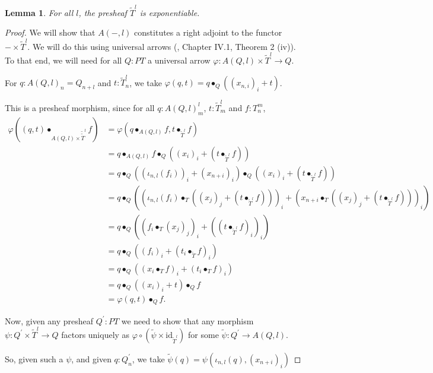 \documentclass[a4paper]{amsbook}
\newtheorem{lemma}{Lemma}
\theoremstyle{definition}
\theoremstyle{remark}
\newcommand{\id}[1]{\ensuremath{\text{id}_{#1}}}
\begin{document}
  \begin{lemma}
    For all $ l $, the presheaf $ \tilde T^l $ is exponentiable.
  \end{lemma}
  \begin{proof}
    We will show that $ A(-, l) $ constitutes a right adjoint to the functor $ - \times \tilde T^l $. We will do this using universal arrows (\cite{MacLane}, Chapter IV.1, Theorem 2 (iv)). To that end, we will need for all $ Q: PT $ a universal arrow $ \varphi: A(Q, l) \times \tilde T^l \to Q $.

    For $ q: A(Q, l)_n = Q_{n + l} $ and $ t: \tilde T^l_n $, we take $ \varphi(q, t) = q \bullet_Q ((x_{n, i})_i + t) $.

    This is a presheaf morphism, since for all $ q: A(Q, l)^l_m $, $ t: \tilde T^l_m $ and $ f: T_n^m $,
    \begin{align*}
      \varphi((q, t) \bullet_{A(Q, l) \times \tilde \tilde T^l} f) &= \varphi(q \bullet_{A(Q, l)} f, t \bullet_{\tilde T^l} f)\\
      &= q \bullet_{A(Q, l)} f \bullet_Q ((x_i)_i + (t \bullet_{\tilde T^l} f))\\
      &= q \bullet_Q ((\iota_{n, l}(f_i))_i + (x_{n + i})_i) \bullet_Q ((x_i)_i + (t \bullet_{\tilde T^l} f))\\
      &= q \bullet_Q ((\iota_{n, l}(f_i) \bullet_T ((x_j)_j + (t \bullet_{\tilde T^l} f)))_i + (x_{n + i} \bullet_T ((x_j)_j + (t \bullet_{\tilde T^l} f)))_i)\\
      &= q \bullet_Q ((f_i \bullet_T (x_j)_j)_i + ((t \bullet_{\tilde T^l} f)_i)_i)\\
      &= q \bullet_Q ((f_i)_i + (t_i \bullet_{\tilde T} f)_i)\\
      &= q \bullet_Q ((x_i \bullet_T f)_i + (t_i \bullet_T f)_i)\\
      &= q \bullet_Q ((x_i)_i + t) \bullet_Q f\\
      &= \varphi(q, t) \bullet_Q f.
    \end{align*}

    Now, given any presheaf $ Q^\prime : P T $ we need to show that any morphism $ \psi: Q^\prime \times \tilde T^l \to Q $ factors uniquely as $ \varphi \circ (\tilde \psi \times \id{\tilde T^l}) $ for some $ \tilde \psi: Q^\prime \to A(Q, l) $.

    So, given such a $ \psi $, and given $ q: Q^\prime_n $, we take $ \tilde \psi(q) = \psi(\iota_{n, l}(q), (x_{n + i})_i) $


\end{proof}
\end{document}
